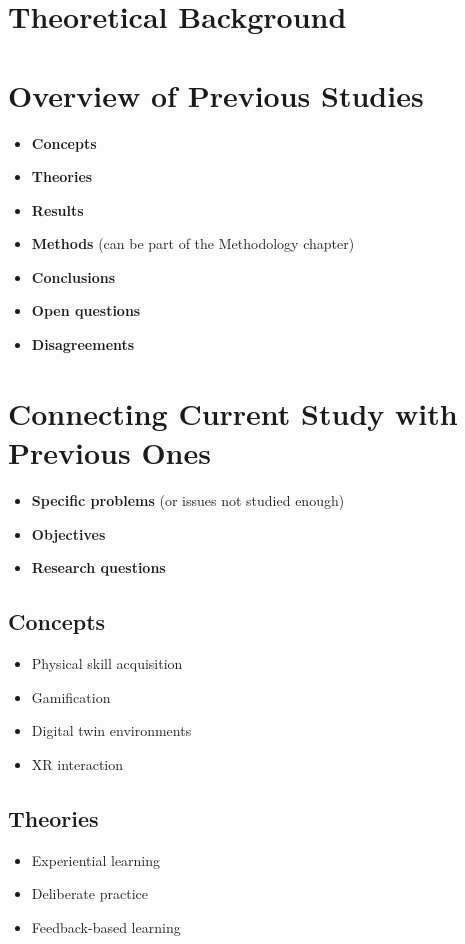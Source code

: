 \newpage
\section{Theoretical Background}

\section*{Overview of Previous Studies}
\begin{itemize}
    \item \textbf{Concepts}
    \item \textbf{Theories}
    \item \textbf{Results}
    \item \textbf{Methods} (can be part of the Methodology chapter)
    \item \textbf{Conclusions}
    \item \textbf{Open questions}
    \item \textbf{Disagreements}
\end{itemize}

\section*{Connecting Current Study with Previous Ones}
\begin{itemize}
    \item \textbf{Specific problems} (or issues not studied enough)
    \item \textbf{Objectives}
    \item \textbf{Research questions}
\end{itemize}

\subsection{Concepts}
\begin{itemize}
    \item Physical skill acquisition
    \item Gamification
    \item Digital twin environments
    \item XR interaction
\end{itemize}

\subsection{Theories}
\begin{itemize}
    \item Experiential learning
    \item Deliberate practice
    \item Feedback-based learning
\end{itemize}

